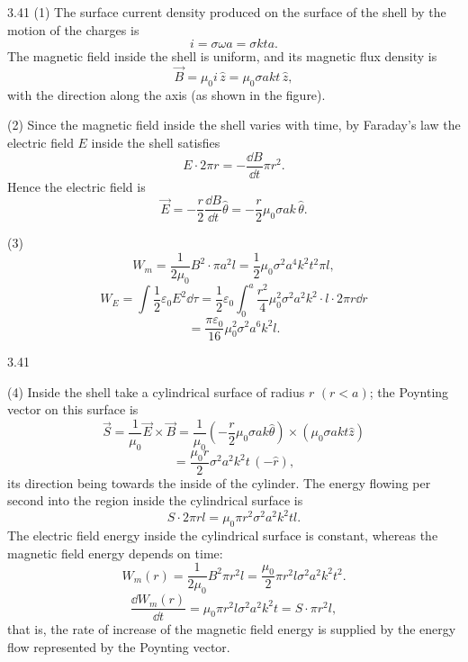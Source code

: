 \begin{solution}{3.41}
(1) The surface current density produced on the surface of the shell by the motion of the charges is
\[
i=\sigma\omega a=\sigma kta .
\]
The magnetic field inside the shell is uniform, and its magnetic flux density is
\[
\vec{B}=\mu_0i\,\hat{z}=\mu_0\sigma akt\,\hat{z},
\]
with the direction along the axis (as shown in the figure).

(2) Since the magnetic field inside the shell varies with time, by Faraday's law the electric field $E$ inside the shell satisfies
\[
E\cdot2\pi r=-\frac{\dd B}{\dd t}\pi r^2 .
\]
Hence the electric field is
\[
\vec{E}=-\frac{r}{2}\frac{\dd B}{\dd t}\hat{\theta}
=-\frac{r}{2}\mu_0\sigma ak\,\hat{\theta}.
\]

(3)
\[
W_m=\frac{1}{2\mu_0}B^2\cdot\pi a^2l=\frac{1}{2}\mu_0\sigma^2a^4k^2t^2\pi l,
\]
\[
W_E=\int\frac{1}{2}\varepsilon_0E^2\dd\tau
=\frac{1}{2}\varepsilon_0\int_0^a\frac{r^2}{4}\mu_0^2\sigma^2a^2k^2\cdot l\cdot2\pi r\dd r
\]
\[
=\frac{\pi\varepsilon_0}{16}\mu_0^2\sigma^2a^6k^2l .
\]

\begin{figbox}{3.41}
\end{figbox}

(4) Inside the shell take a cylindrical surface of radius $r$ $(r<a)$; the Poynting vector on this surface is
\[
\vec{S}=\frac{1}{\mu_0}\vec{E}\times\vec{B}
=\frac{1}{\mu_0}\left(-\frac{r}{2}\mu_0\sigma ak\hat{\theta}\right)\times\left(\mu_0\sigma akt\hat{z}\right)
\]
\[
=\frac{\mu_0r}{2}\sigma^2a^2k^2t\,(-\hat{r}),
\]
its direction being towards the inside of the cylinder. The energy flowing per second into the region inside the cylindrical surface is
\[
S\cdot2\pi rl=\mu_0\pi r^2\sigma^2a^2k^2tl .
\]
The electric field energy inside the cylindrical surface is constant, whereas the magnetic field energy depends on time:
\[
W_m(r)=\frac{1}{2\mu_0}B^2\pi r^2l=\frac{\mu_0}{2}\pi r^2l\sigma^2a^2k^2t^2 .
\]
\[
\frac{\dd W_m(r)}{\dd t}=\mu_0\pi r^2l\sigma^2a^2k^2t=S\cdot\pi r^2l,
\]
that is, the rate of increase of the magnetic field energy is supplied by the energy flow represented by the Poynting vector.
\end{solution}

